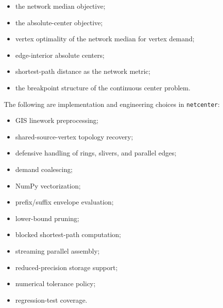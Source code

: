 \documentclass[11pt]{article}
\begin{document}
\begin{itemize}[leftmargin=1.5em]

\item the network median objective;

\item the absolute-center objective;

\item vertex optimality of the network median for vertex demand;

\item edge-interior absolute centers;

\item shortest-path distance as the network metric;

\item the breakpoint structure of the continuous center problem.

\end{itemize}

The following are implementation and engineering choices in \texttt{netcenter}:

\begin{itemize}[leftmargin=1.5em]

\item GIS linework preprocessing;

\item shared-source-vertex topology recovery;

\item defensive handling of rings, slivers, and parallel edges;

\item demand coalescing;

\item NumPy vectorization;

\item prefix/suffix envelope evaluation;

\item lower-bound pruning;

\item blocked shortest-path computation;

\item streaming parallel assembly;

\item reduced-precision storage support;

\item numerical tolerance policy;

\item regression-test coverage.

\end{itemize}
\end{document}
